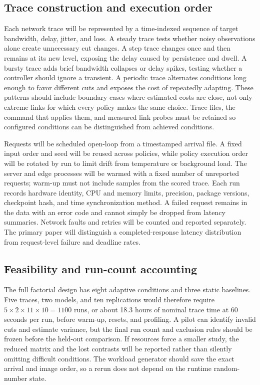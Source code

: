 \documentclass[10pt,a4paper,twocolumn]{article}
\begin{document}
\subsection{Trace construction and execution order}
Each network trace will be represented by a time-indexed sequence of target bandwidth, delay, jitter, and loss. A steady trace tests whether noisy observations alone create unnecessary cut changes. A step trace changes once and then remains at its new level, exposing the delay caused by persistence and dwell. A bursty trace adds brief bandwidth collapses or delay spikes, testing whether a controller should ignore a transient. A periodic trace alternates conditions long enough to favor different cuts and exposes the cost of repeatedly adapting. These patterns should include boundary cases where estimated costs are close, not only extreme links for which every policy makes the same choice. Trace files, the command that applies them, and measured link probes must be retained so configured conditions can be distinguished from achieved conditions.

Requests will be scheduled open-loop from a timestamped arrival file. A fixed input order and seed will be reused across policies, while policy execution order will be rotated by run to limit drift from temperature or background load. The server and edge processes will be warmed with a fixed number of unreported requests; warm-up must not include samples from the scored trace. Each run records hardware identity, CPU and memory limits, precision, package versions, checkpoint hash, and time synchronization method. A failed request remains in the data with an error code and cannot simply be dropped from latency summaries. Network faults and retries will be counted and reported separately. The primary paper will distinguish a completed-response latency distribution from request-level failure and deadline rates.

\subsection{Feasibility and run-count accounting}
The full factorial design has eight adaptive conditions and three static baselines. Five traces, two models, and ten replications would therefore require $5\times2\times11\times10=1100$ runs, or about 18.3 hours of nominal trace time at 60 seconds per run, before warm-up, resets, and profiling. A pilot can identify invalid cuts and estimate variance, but the final run count and exclusion rules should be frozen before the held-out comparison. If resources force a smaller study, the reduced matrix and the lost contrasts will be reported rather than silently omitting difficult conditions. The workload generator should save the exact arrival and image order, so a rerun does not depend on the runtime random-number state.
\end{document}
